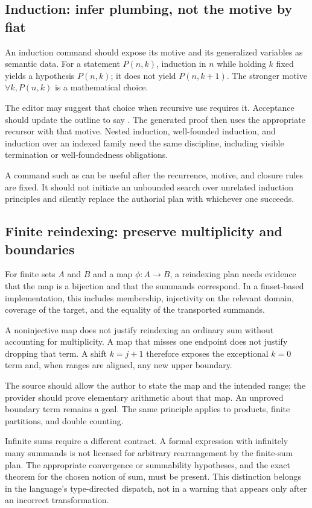 \documentclass[11pt,a4paper]{article}
\theoremstyle{definition}
\theoremstyle{remark}
\numberwithin{equation}{section}
\begin{document}
\subsection{Induction: infer plumbing, not the motive by fiat}
An induction command should expose its motive and its generalized variables as semantic data. For a statement $P(n,k)$, induction in $n$ while holding $k$ fixed yields a hypothesis $P(n,k)$; it does not yield $P(n,k+1)$. The stronger motive $\forall k, P(n,k)$ is a mathematical choice.

The editor may suggest that choice when recursive use requires it. Acceptance should update the outline to say \texttt{}. The generated proof then uses the appropriate recursor with that motive. Nested induction, well-founded induction, and induction over an indexed family need the same discipline, including visible termination or well-foundedness obligations.

A command such as \texttt{} can be useful after the recurrence, motive, and closure rules are fixed. It should not initiate an unbounded search over unrelated induction principles and silently replace the authorial plan with whichever one succeeds.

\subsection{Finite reindexing: preserve multiplicity and boundaries}
For finite sets $A$ and $B$ and a map $\phi:A\to B$, a reindexing plan needs evidence that the map is a bijection and that the summands correspond. In a finset-based implementation, this includes membership, injectivity on the relevant domain, coverage of the target, and the equality of the transported summands.

A noninjective map does not justify reindexing an ordinary sum without accounting for multiplicity. A map that misses one endpoint does not justify dropping that term. A shift $k=j+1$ therefore exposes the exceptional $k=0$ term and, when ranges are aligned, any new upper boundary.

The source should allow the author to state the map and the intended range; the provider should prove elementary arithmetic about that map. An unproved boundary term remains a goal. The same principle applies to products, finite partitions, and double counting.

Infinite sums require a different contract. A formal expression with infinitely many summands is not licensed for arbitrary rearrangement by the finite-sum plan. The appropriate convergence or summability hypotheses, and the exact theorem for the chosen notion of sum, must be present. This distinction belongs in the language's type-directed dispatch, not in a warning that appears only after an incorrect transformation.
\end{document}
